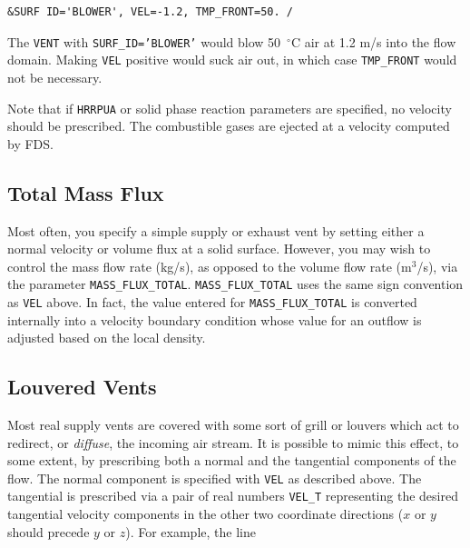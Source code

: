 \documentclass[11pt]{book}
\newcommand{\ct}{\tt\small}
\begin{document}
\footnotesize
\begin{verbatim}
&SURF ID='BLOWER', VEL=-1.2, TMP_FRONT=50. /
\end{verbatim}
\normalsize

\noindent
The {\ct VENT} with {\ct SURF\_ID='BLOWER'} would blow 50~$^\circ$C
air at 1.2 m/s into the flow domain. Making {\ct VEL} positive would
suck air out, in which case {\ct TMP\_FRONT} would not be necessary.

\begin{warning}
\noindent
Note that if {\ct HRRPUA} or solid phase reaction parameters are
specified, no velocity should be prescribed. The combustible gases
are ejected at a velocity computed by FDS.
\end{warning}


\subsection{Total Mass Flux}

\label{info:MASS_FLUX_TOTAL}

Most often, you specify a simple supply or exhaust vent by setting either a normal velocity or volume flux at
a solid surface. However, you may wish to control the mass flow rate (kg/s), as opposed to the volume flow
rate (m$^3$/s), via the parameter {\ct MASS\_FLUX\_TOTAL}.
{\ct MASS\_FLUX\_TOTAL} uses the same sign convention as {\ct VEL} above.  In fact, the value entered for
{\ct MASS\_FLUX\_TOTAL} is converted internally into a velocity boundary condition whose value
for an outflow is adjusted based on the local density.



\subsection{Louvered Vents}

\label{info:louvers}

Most real supply vents are covered with some sort of grill or louvers which act to redirect, or {\em diffuse}, the
incoming air stream.
It is possible to mimic this effect, to some extent, by prescribing both a normal and the tangential components of the flow.
The normal component is specified with {\ct VEL} as described above. The tangential is prescribed
via a pair of real numbers {\ct VEL\_T} representing the desired tangential
velocity components in the other two coordinate directions ($x$ or $y$ should precede $y$ or $z$). For example, the line
\end{document}
